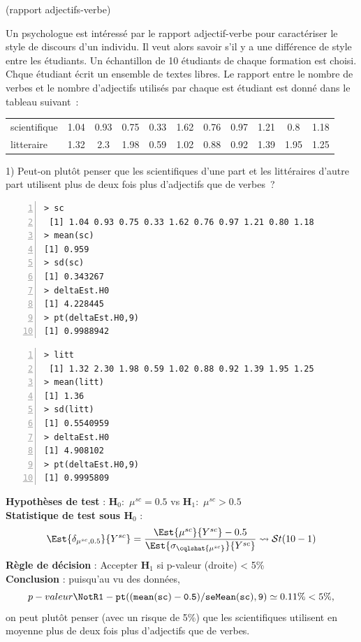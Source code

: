 \documentclass[10pt]{report}
\begin{document}
\begin{exercice} (rapport adjectifs-verbe)

Un psychologue est intéressé par le rapport adjectif-verbe pour caractériser le style de discours d'un individu. Il veut alors savoir s'il y a une différence de style entre les étudiants. Un échantillon de 10 étudiants de chaque formation est choisi. Chque étudiant écrit un ensemble de textes libres. Le rapport entre le nombre de verbes et le nombre d'adjectifs utilisés par chaque est étudiant est donné dans le tableau suivant~:

\begin{tabular}{|l|cccccccccc|}
\hline
scientifique&1.04& 0.93& 0.75& 0.33& 1.62& 0.76& 0.97& 1.21& 0.8 &1.18 \\
litteraire& 1.32& 2.3 & 1.98 &0.59& 1.02 &0.88& 0.92& 1.39 &1.95 &1.25 \\
\hline
\end{tabular}

1) Peut-on plutôt penser que les scientifiques d'une part et les littéraires d'autre part utilisent plus de deux fois plus d'adjectifs que de verbes~?

\IndicR
\begin{Verbatim}[frame=leftline,fontfamily=tt,fontshape=n,numbers=left]
> sc
 [1] 1.04 0.93 0.75 0.33 1.62 0.76 0.97 1.21 0.80 1.18
> mean(sc)
[1] 0.959
> sd(sc)
[1] 0.343267
> deltaEst.H0
[1] 4.228445
> pt(deltaEst.H0,9)
[1] 0.9988942
\end{Verbatim}
 
\begin{Verbatim}[frame=leftline,fontfamily=tt,fontshape=n,numbers=left]
> litt
 [1] 1.32 2.30 1.98 0.59 1.02 0.88 0.92 1.39 1.95 1.25
> mean(litt)
[1] 1.36
> sd(litt)
[1] 0.5540959
> deltaEst.H0
[1] 4.908102
> pt(deltaEst.H0,9)
[1] 0.9995809
\end{Verbatim}
 
 

\begin{Correction}

\noindent \textbf{Hypothèses de test} : $\mathbf{H}_0:$ $\mu^{sc}=0.5$ vs {\large $\mathbf{H}_1:$ $\mu^{sc}>0.5$}\\
\textbf{Statistique de test sous $\mathbf{H}_0$} :
  $$
  \Est{\delta_{\mu^{sc},0.5}}{Y^{sc}}= {\displaystyle \frac{\Est{\mu^{sc}}{Y^{sc}}-0.5}{
\Est{\sigma_{\cqlshat{\mu^{sc}}}}{Y^{sc}}
}} 
  \leadsto \mathcal{S}t(10-1)
  $$
\textbf{Règle de décision} : Accepter $\mathbf{H}_1$ si 
  p-valeur (droite) < 5\%\\
\noindent \textbf{Conclusion} :
puisqu'au vu des données, 
  \[
p-valeur\NotR\mathtt{1-pt((mean(sc)-0.5)/seMean(sc),9)} \simeq 0.11\% < 5\%,
\]
on peut plutôt penser (avec un risque de 5\%) que les scientifiques utilisent en moyenne plus de deux fois plus d'adjectifs que de verbes.


\end{Correction}
\end{exercice}
\end{document}
